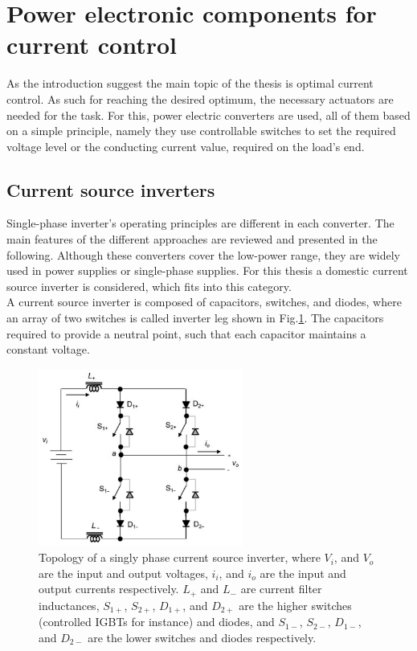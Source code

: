 \section{Power electronic components for current control}\label{BASICCSR:sec:PowerGeneral}

As the introduction suggest the main topic of the thesis is optimal current control. As such for reaching the desired optimum, the necessary actuators are needed for the task. For this, power electric converters are used, all of them based on a simple principle, namely they use controllable switches to set the required voltage level or the conducting current value, required on the load's end.

\subsection{Current source inverters}\label{BASICCSR:sec:CSI}

Single-phase inverter's operating principles are different in each converter. The main features of the different approaches are reviewed and presented in the following. Although these converters cover the low-power range, they are widely used in power supplies or single-phase supplies. For this thesis a domestic current source inverter is considered, which fits into this category.\\
A current source inverter is composed of capacitors, switches, and diodes, where an array of two switches is called inverter leg shown in Fig.\ref{BASICCSR:fig:SingleCSI}. The capacitors required to provide a neutral point, such that each capacitor maintains a constant voltage.

\begin{figure}[!ht]
        \centering
        \includegraphics[width=0.6\textwidth]{EMPC_PNG_Pics/CurrentSourceInverter.png}
        \caption{Topology of a singly phase current source inverter, where $V_i$, and $V_o$ are the input and output voltages, $i_i$, and $i_o$ are the input and output currents respectively. $L_+$ and $L_-$ are current filter inductances, $S_{1+}$, $S_{2+}$, $D_{1+}$, and $D_{2+}$ are the higher switches (controlled IGBTs for instance) and diodes, and $S_{1-}$, $S_{2-}$, $D_{1-}$, and $D_{2-}$ are the lower switches and diodes respectively.}
        \label{BASICCSR:fig:SingleCSI}
    \end{figure}

